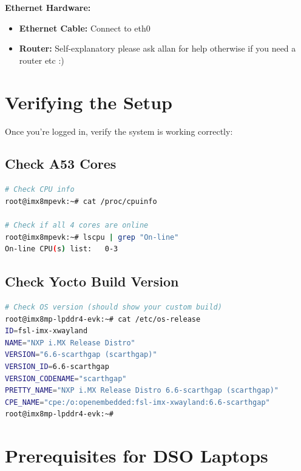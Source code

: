 \documentclass[12pt,a4paper]{report}
\begin{document}
\begin{hardware}
\textbf{Ethernet Hardware:}
\begin{itemize}
    \item \textbf{Ethernet Cable:} Connect to eth0 
    \item \textbf{Router:} Self-explanatory \newline
    please ask allan for help otherwise if you need a router etc :)
\end{itemize}
\end{hardware}

\pagebreak

\section{Verifying the Setup}

Once you're logged in, verify the system is working correctly:

\subsection{Check A53 Cores}

\begin{lstlisting}[language=bash]
# Check CPU info
root@imx8mpevk:~# cat /proc/cpuinfo 

# Check if all 4 cores are online
root@imx8mpevk:~# lscpu | grep "On-line"
On-line CPU(s) list:   0-3
\end{lstlisting}

\subsection{Check Yocto Build Version}

\begin{lstlisting}[language=bash]
# Check OS version (should show your custom build)
root@imx8mp-lpddr4-evk:~# cat /etc/os-release
ID=fsl-imx-xwayland
NAME="NXP i.MX Release Distro"
VERSION="6.6-scarthgap (scarthgap)"
VERSION_ID=6.6-scarthgap
VERSION_CODENAME="scarthgap"
PRETTY_NAME="NXP i.MX Release Distro 6.6-scarthgap (scarthgap)"
CPE_NAME="cpe:/o:openembedded:fsl-imx-xwayland:6.6-scarthgap"
root@imx8mp-lpddr4-evk:~#

\end{lstlisting}
\section{Prerequisites for DSO Laptops}
\end{document}
